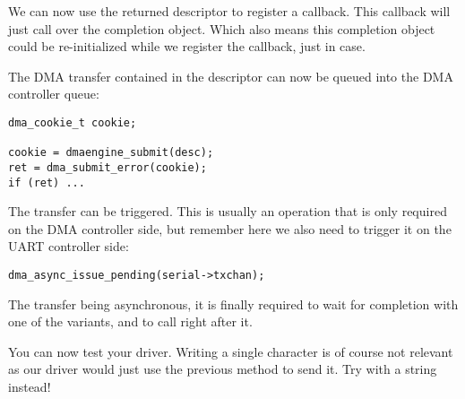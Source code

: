 We can now use the returned descriptor to register a callback. This callback
will just call  over the completion object. Which also means
this completion object could be re-initialized while we register the callback,
just in case.

The DMA transfer contained in the descriptor can now be queued into the DMA
controller queue:

\begin{verbatim}
dma_cookie_t cookie;

cookie = dmaengine_submit(desc);
ret = dma_submit_error(cookie);
if (ret) ...
\end{verbatim}

The transfer can be triggered. This is usually an operation that is only
required on the DMA controller side, but remember here we also need to trigger
it on the UART controller side:

\begin{verbatim}
dma_async_issue_pending(serial->txchan);
\end{verbatim}

The transfer being asynchronous, it is finally required to wait for completion
with one of the  variants, and to call
 right after it.

You can now test your driver. Writing a single character is of course not
relevant as our driver would just use the previous method to send it. Try with
a string instead!
